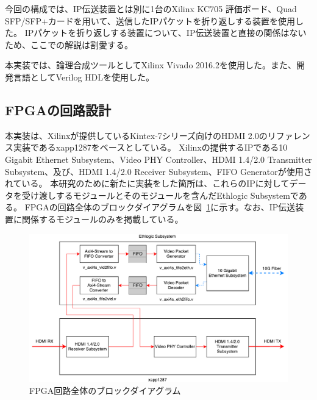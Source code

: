 
今回の構成では、IP伝送装置とは別に1台のXilinx KC705 評価ボード、Quad SFP/SFP+カードを用いて、送信したIPパケットを折り返しする装置を使用した。
IPパケットを折り返しする装置について、IP伝送装置と直接の関係はないため、ここでの解説は割愛する。

本実装では、論理合成ツールとしてXilinx Vivado 2016.2を使用した。また、開発言語としてVerilog HDLを使用した。

\subsection{FPGAの回路設計}

本実装は、Xilinxが提供しているKintex-7シリーズ向けのHDMI 2.0のリファレンス実装であるxapp1287\cite{xilinx-xapp1287}をベースとしている。
Xilinxの提供するIPである10 Gigabit Ethernet Subsystem\cite{xilinx-pg157}、Video PHY Controller\cite{xilinx-pg230}、HDMI 1.4/2.0 Transmitter Subsystem\cite{xilinx-pg235}、及び、HDMI 1.4/2.0 Receiver Subsystem\cite{xilinx-pg236}、FIFO Generator\cite{xilinx-pg057}が使用されている。
本研究のために新たに実装をした箇所は、これらのIPに対してデータを受け渡しするモジュールとそのモジュールを含んだEthlogic Subsystemである。
FPGAの回路全体のブロックダイアグラムを図~\ref{fig:fpga-whole-diagram}に示す。なお、IP伝送装置に関係するモジュールのみを掲載している。

\begin{figure}[htbp]
  \begin{center}
    \includegraphics[bb=0 0 738 423,width=15.5cm]{img/fpga-whole-diagram.pdf}
  \end{center}
  \caption{FPGA回路全体のブロックダイアグラム}
  \label{fig:fpga-whole-diagram}
\end{figure}

